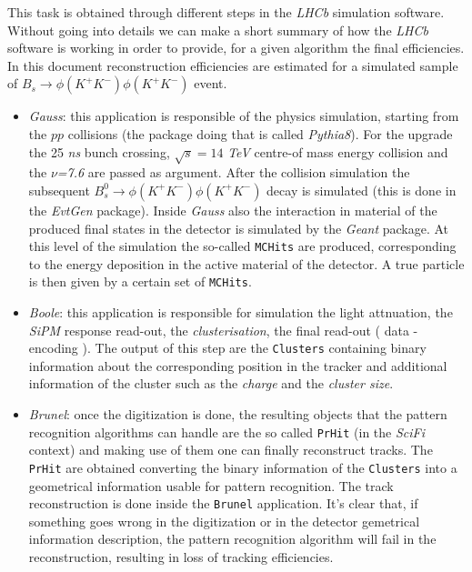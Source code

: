 \documentclass[paper=a4, fontsize=10pt]{scrartcl}
\numberwithin{equation}{section}		%
\numberwithin{figure}{section}			%
\numberwithin{table}{section}				%
\begin{document}
This task is obtained through different steps in the \textit{LHCb} simulation software. 
Without going into details we can make a short summary of how the \textit{LHCb} software is working in order to provide, for a given algorithm the final efficiencies. In this document reconstruction efficiencies are estimated for a simulated sample of  $B_s\rightarrow \phi\left( K^{+}K^{-}\right) \phi \left( K^{+}K^{-} \right)$ event.
\begin{itemize}
  \item{\textit{Gauss}: this application is responsible of the physics simulation, starting from the $pp$ collisions (the package doing that is called \textit{Pythia8}). For the upgrade the 25 \textit{ns} bunch crossing, $\sqrt{s}= 14$ \textit{TeV} centre-of mass energy collision and the $\nu$\textit{=7.6} are passed as argument. After the collision simulation the subsequent $B^{0}_s\rightarrow \phi\left( K^{+}K^{-}\right) \phi \left(K^{+} K^{-} \right)$ decay is simulated (this is done in the \textit{EvtGen} package).
 Inside \textit{Gauss} also the interaction in material of the produced final states in the detector is simulated by the \textit{Geant} package. At this level of the simulation the so-called \texttt{MCHits} are produced, corresponding to the energy deposition in the active material of the detector. A true particle is then given by a certain set of \texttt{MCHits}.}
\item{\textit{Boole}: this application is responsible for simulation the light attnuation, the \textit{SiPM} response read-out, the \textit{clusterisation}, the final read-out ( data - encoding ). The output of this step are the \texttt{Clusters} containing binary information about the corresponding position in the tracker and additional information of the cluster such as the \textit{charge} and the \textit{cluster size}.}
\item{\textit{Brunel}: once the digitization is done, the resulting objects that the pattern recognition algorithms can handle are the so called \texttt{PrHit} (in the \textit{SciFi} context) and making use of them one can finally reconstruct tracks. The \texttt{PrHit} are obtained converting the binary information of the \texttt{Clusters} into a geometrical information usable for pattern recognition. The track reconstruction is done inside the \texttt{Brunel} application. It's clear that, if something goes wrong in the digitization or in the detector gemetrical information description, the pattern recognition algorithm will fail in the reconstruction, resulting in loss of tracking efficiencies.}

\end{itemize}
\end{document}
